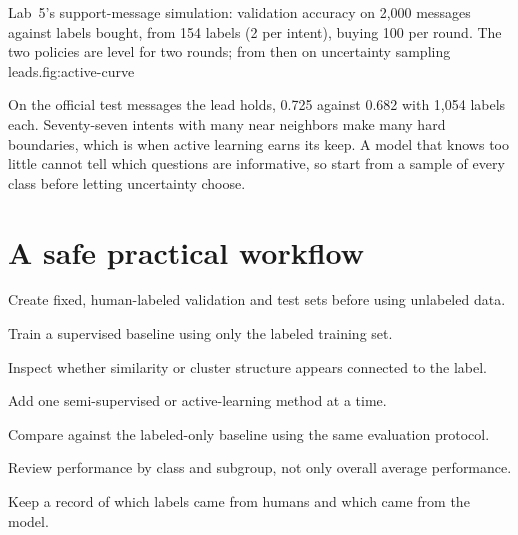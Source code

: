 \begin{utpfig}{Lab~5's support-message simulation: validation accuracy on 2,000 messages against labels bought, from 154 labels (2 per intent), buying 100 per round. The two policies are level for two rounds; from then on uncertainty sampling leads.}{fig:active-curve}
\end{utpfig}

On the official test messages the lead holds, 0.725 against 0.682 with 1,054 labels each. Seventy-seven intents with many near neighbors make many hard boundaries, which is when active learning earns its keep. A model that knows too little cannot tell which questions are informative, so start from a sample of every class before letting uncertainty choose.

\section{A safe practical workflow}

\begin{utpsteps}
  \item Create fixed, human-labeled validation and test sets before using unlabeled data.
  \item Train a supervised baseline using only the labeled training set.
  \item Inspect whether similarity or cluster structure appears connected to the label.
  \item Add one semi-supervised or active-learning method at a time.
  \item Compare against the labeled-only baseline using the same evaluation protocol.
  \item Review performance by class and subgroup, not only overall average performance.
  \item Keep a record of which labels came from humans and which came from the model.
\end{utpsteps}

